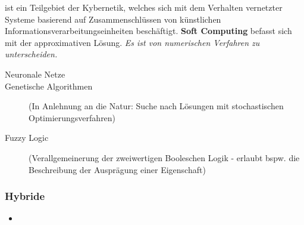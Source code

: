 \documentclass[runningheads]{llncs}
\begin{document}
ist ein Teilgebiet der Kybernetik, welches sich mit dem Verhalten vernetzter Systeme basierend auf Zusammenschlüssen von künstlichen Informationsverarbeitungseinheiten beschäftigt. \textbf{Soft Computing} befasst sich mit der approximativen Lösung. \textit{Es ist von numerischen Verfahren zu unterscheiden.}

\begin{description}
    \item[ Neuronale Netze]
    \item[ Genetische Algorithmen ] (In Anlehnung an die Natur: Suche nach Lösungen mit stochastischen Optimierungsverfahren)
    \item[ Fuzzy Logic ] (Verallgemeinerung der zweiwertigen Booleschen Logik - erlaubt bspw. die Beschreibung der Ausprägung einer Eigenschaft)
\end{description}

\subsubsection{Hybride}

\begin{itemize}
    \item 
\end{itemize}
\end{document}
